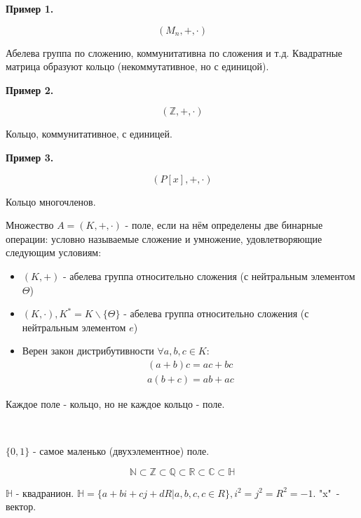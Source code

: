 \textbf{Пример 1.}

\[ (M_n, +, \cdot) \]

Абелева группа по сложению, коммунитативна по сложения и т.д. Квадратные матрица образуют кольцо (некоммутативное, но с единицой).

\textbf{Пример 2.}

\[ (\mathbb{Z}, +, \cdot) \]

Кольцо, коммунитативное, с единицей.

\textbf{Пример 3.}

\[ (P[x], +, \cdot) \]

Кольцо многочленов.

\begin{definition}
	Множество $A = (K, +, \cdot)$ - поле, если на нём определены две бинарные операции: условно называемые сложение и умножение, удовлетворяющие следующим условиям:
	\begin{itemize}
		\item $(K, +)$ - абелева группа относительно сложения (с нейтральным элементом $\Theta$)
		\item $(K, \cdot), K^* = K \backslash \{\Theta\}$ - абелева группа относительно сложения (с нейтральным элементом $e$)
		\item Верен закон дистрибутивности $\forall a, b, c \in K:$
		\[
		\begin{aligned}
		(a+b)c = ac + bc \\
		a(b+c) = ab + ac
		\end{aligned}
		\]
	\end{itemize}
\end{definition}

\begin{remark}
	Каждое поле - кольцо, но не каждое кольцо - поле.
\end{remark}

~

$\{0,1\}$ - самое маленько (двухэлементное) поле.

\[ \mathbb{N} \subset \mathbb{Z} \subset \mathbb{Q} \subset \mathbb{R} \subset \mathbb{C} \subset \mathbb{H} \]

$\mathbb{H}$ - квадранион. $\mathbb{H} = \{ a + bi + cj + dR | a, b, c, c \in R \}, i^2 = j^2 = R^2 = -1$. "x"\ - вектор.

